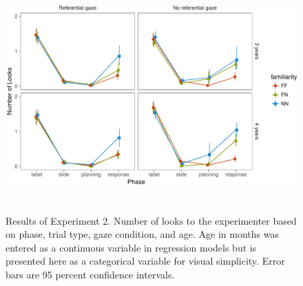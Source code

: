 \documentclass[a4paper,man,apacite,floatsintext]{apa6}
\newenvironment{CodeChunk}{}{}
\begin{document}
\begin{CodeChunk}
\begin{figure}[b]

{\centering \includegraphics[width=5.75in,height=3.5in]{figs/results_e2-1} 

}

\caption[Results of Experiment 2]{Results of Experiment 2. Number of looks to the experimenter based on phase, trial type, gaze condition, and age. Age in months was entered as a continuous variable in regression models but is presented here as a categorical variable for visual simplicity. Error bars are 95 percent confidence intervals.}\label{fig:results_e2}
\end{figure}
\end{CodeChunk}
\end{document}
